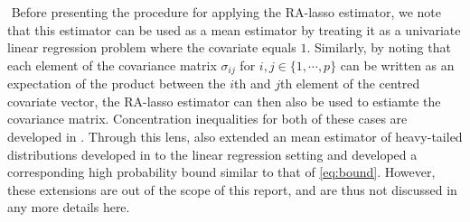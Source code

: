 $ $\newline
Before presenting the procedure for applying the RA-lasso estimator, we note that this estimator can be used as a mean estimator by treating it as a univariate linear regression problem where the covariate equals $1$. Similarly, by noting that each element of the covariance matrix $\sigma_{ij}$ for $i,j\in\{1,\cdots,p\}$ can be written as an expectation of the product between the $i$th and $j$th element of the centred covariate vector, the RA-lasso estimator can then also be used to estiamte the covariance matrix. Concentration inequalities for both of these cases are developed in \citet{fan2017estimation}. Through this lens, \citet{fan2017estimation} also extended an mean estimator of heavy-tailed distributions developed in \citet{catoni2012challenging} to the linear regression setting and developed a corresponding high probability bound similar to that of \cref{eq:bound}. However, these extensions are out of the scope of this report, and are thus not discussed in any more details here.

